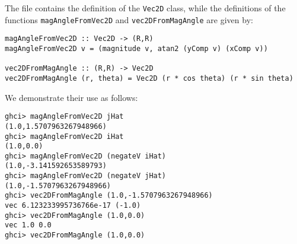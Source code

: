 
The file  contains the definition of the \verb|Vec2D| class,
while the definitions of the functions \verb|magAngleFromVec2D| and \verb|vec2DFromMagAngle|
are given by:
\scriptsize\begin{verbatim}
magAngleFromVec2D :: Vec2D -> (R,R)
magAngleFromVec2D v = (magnitude v, atan2 (yComp v) (xComp v))

vec2DFromMagAngle :: (R,R) -> Vec2D
vec2DFromMagAngle (r, theta) = Vec2D (r * cos theta) (r * sin theta)
\end{verbatim}\normalsize

We demonstrate their use as follows:
\scriptsize\begin{verbatim}
ghci> magAngleFromVec2D jHat
(1.0,1.5707963267948966)
ghci> magAngleFromVec2D iHat
(1.0,0.0)
ghci> magAngleFromVec2D (negateV iHat)
(1.0,-3.141592653589793)
ghci> magAngleFromVec2D (negateV jHat)
(1.0,-1.5707963267948966)
ghci> vec2DFromMagAngle (1.0,-1.5707963267948966)
vec 6.123233995736766e-17 (-1.0) 
ghci> vec2DFromMagAngle (1.0,0.0)
vec 1.0 0.0 
ghci> vec2DFromMagAngle (1.0,0.0)
\end{verbatim}\normalsize
